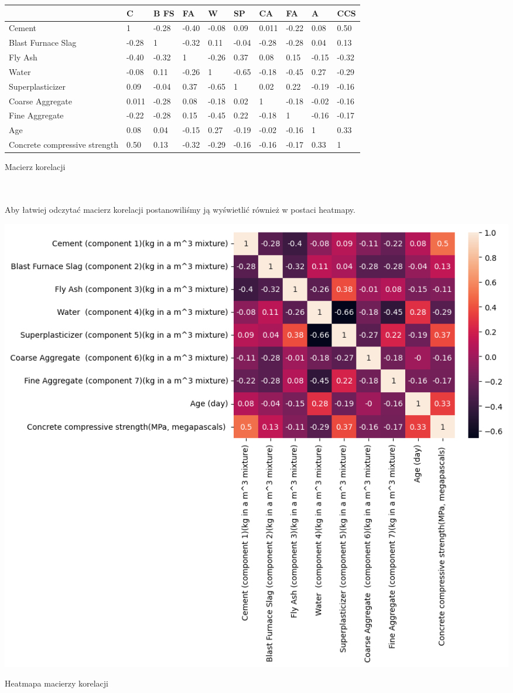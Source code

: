 \documentclass[11pt, a4paper, notitlepage]{report}
\begin{document}
\begin{center}
	\small
	\begin{tabular}{|m{3cm} | m{0.8cm} m{0.8cm} m{0.8cm} m{0.8cm} m{0.8cm} m{0.8cm} m{0.8cm} m{0.8cm} m{0.8cm}|}
\hline
 & C & B FS&FA & W & SP & CA & FA & A & CCS \\
\hline
Cement & 1 & -0.28 & -0.40 & -0.08 & 0.09 & 0.011 & -0.22 & 0.08 & 0.50 \\
Blast Furnace Slag & -0.28 & 1 & -0.32 & 0.11 & -0.04 & -0.28 & -0.28 & 0.04 & 0.13 \\
Fly Ash & -0.40 & -0.32 & 1 & -0.26 & 0.37 & 0.08 & 0.15 & -0.15 & -0.32 \\
Water & -0.08 & 0.11 & -0.26 & 1 & -0.65 & -0.18 & -0.45 & 0.27 & -0.29 \\
Super\-plasticizer & 0.09 & -0.04 & 0.37 & -0.65 & 1 & 0.02 & 0.22 & -0.19 & -0.16 \\
Coarse Aggregate & 0.011 & -0.28 & 0.08 & -0.18 & 0.02 & 1 & -0.18 & -0.02 & -0.16 \\
Fine Aggregate & -0.22 & -0.28 & 0.15 & -0.45 & 0.22 & -0.18 & 1 & -0.16 & -0.17 \\
Age & 0.08 & 0.04 & -0.15 & 0.27 & -0.19 & -0.02 & -0.16 & 1 & 0.33 \\
Concrete compressive strength & 0.50 & 0.13 & -0.32 & -0.29 & -0.16 & -0.16 & -0.17 & 0.33 & 1 \\
\hline
\end{tabular}
	\caption{Macierz korelacji}
\end{center}
\\ \\
Aby łatwiej odczytać macierz korelacji postanowiliśmy ją wyświetlić również w postaci heatmapy.
\\
\begin{center}
	\small
	\includegraphics[width=1\textwidth]{graphics/data_analysis/heatmap}
	\caption{Heatmapa macierzy korelacji}
\end{center}
\end{document}
